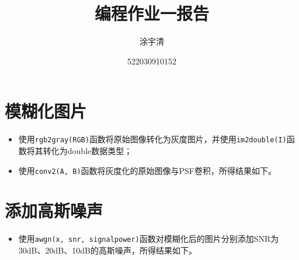 \documentclass[UTF8,a4paper,12pt]{ctexart}
\title{\textbf{\Large{编程作业一报告}}}
\author{涂宇清}
\date{522030910152}
\begin{document}
 
\maketitle
\setcounter{page}{1}        %
 
 
\section{模糊化图片}
\begin{itemize}
    \item 使用\verb|rgb2gray(RGB)|函数将原始图像转化为灰度图片，并使用\verb|im2double(I)|函数将其转化为double数据类型；
    \item 使用\verb|conv2(A, B)|函数将灰度化的原始图像与PSF卷积，所得结果如下。
\end{itemize}

\begin{figure}[H]   %
  \centering
  \centering
\end{figure}
 
\section{添加高斯噪声}
\begin{itemize}
  \item 使用\verb|awgn(x, snr, signalpower)|函数对模糊化后的图片分别添加SNR为30dB、20dB、10dB的高斯噪声，所得结果如下。
\end{itemize}

\begin{figure}[H]   %
  \centering
  \centering
  \centering
\end{figure}
\end{document}
